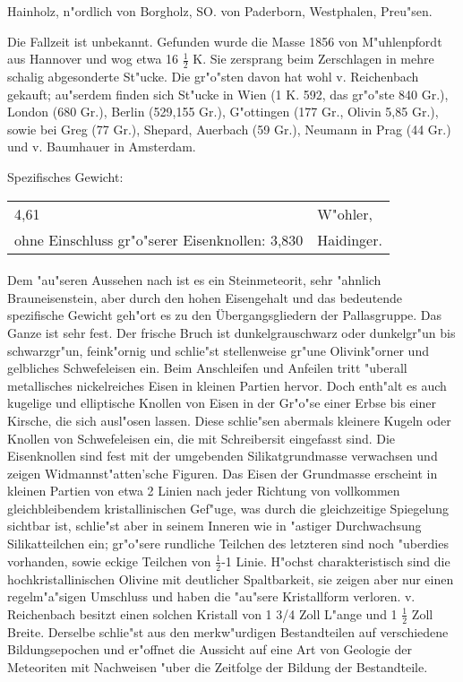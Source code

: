 \documentclass[a4paper, 11pt, oneside]{article}
\begin{document}
Hainholz, n"ordlich von Borgholz, SO. von Paderborn, Westphalen, Preu"sen.

Die Fallzeit ist unbekannt. Gefunden wurde die Masse 1856 von M"uhlenpfordt aus Hannover und wog etwa 16 $\frac{1}{2}$ K. Sie zersprang beim Zerschlagen in mehre schalig abgesonderte St"ucke. Die gr"o"sten davon hat wohl v. Reichenbach gekauft; au"serdem finden sich St"ucke in Wien (1 K. 592, das gr"o"ste 840 Gr.), London (680 Gr.), Berlin (529,155 Gr.), G"ottingen (177 Gr., Olivin 5,85 Gr.), sowie bei Greg (77 Gr.), Shepard, Auerbach (59 Gr.), Neumann in Prag (44 Gr.) und v. Baumhauer in Amsterdam.

Spezifisches Gewicht: 
\begin{table}[!ht]
    \centering
    \begin{tabular}{l l}
        4,61 & W"ohler,\\
        ohne Einschluss gr"o"serer Eisenknollen: 3,830 & Haidinger.
    \end{tabular}
\end{table}
\paragraph{}
Dem "au"seren Aussehen nach ist es ein Steinmeteorit, sehr "ahnlich Brauneisenstein, aber durch den hohen Eisengehalt und das bedeutende spezifische Gewicht geh"ort es zu den Übergangsgliedern der Pallasgruppe. Das Ganze ist sehr fest. Der frische Bruch ist dunkelgrauschwarz oder dunkelgr"un bis schwarzgr"un, feink"ornig und schlie"st stellenweise gr"une Olivink"orner und gelbliches Schwefeleisen ein. Beim Anschleifen und Anfeilen tritt "uberall metallisches nickelreiches Eisen in kleinen Partien hervor. Doch enth"alt es auch kugelige und elliptische Knollen von Eisen in der Gr"o"se einer Erbse bis einer Kirsche, die sich ausl"osen lassen. Diese schlie"sen abermals kleinere Kugeln oder Knollen von Schwefeleisen ein, die mit Schreibersit eingefasst sind. Die Eisenknollen sind fest mit der umgebenden Silikatgrundmasse verwachsen und zeigen Widmannst"atten'sche Figuren. Das Eisen der Grundmasse erscheint in kleinen Partien von etwa 2 Linien nach jeder Richtung von vollkommen gleichbleibendem kristallinischen Gef"uge, was durch die gleichzeitige Spiegelung sichtbar ist, schlie"st aber in seinem Inneren wie in "astiger Durchwachsung Silikatteilchen ein; gr"o"sere rundliche Teilchen des letzteren sind noch "uberdies vorhanden, sowie eckige Teilchen von $\frac{1}{2}$-1 Linie. H"ochst charakteristisch sind die hochkristallinischen Olivine mit deutlicher Spaltbarkeit, sie zeigen aber nur einen regelm"a"sigen Umschluss und haben die "au"sere Kristallform verloren. v. Reichenbach besitzt einen solchen Kristall von 1 3/4 Zoll L"ange und 1 $\frac{1}{2}$ Zoll Breite. Derselbe schlie"st aus den merkw"urdigen Bestandteilen auf verschiedene Bildungsepochen und er"offnet die Aussicht auf eine Art von Geologie der Meteoriten mit Nachweisen "uber die Zeitfolge der Bildung der Bestandteile.
\end{document}
